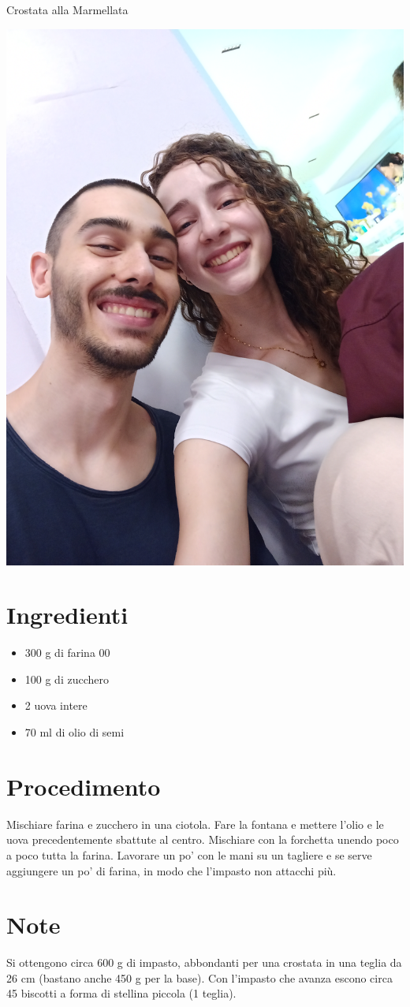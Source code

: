 \documentclass[../../main.tex]{subfiles}
\begin{document}
Crostata alla Marmellata

\noindent
\begin{minipage}[t]{0.3\textwidth}
    \includegraphics[valign=T, width=1\linewidth]{images/test.jpg}  %
    \section*{Ingredienti}
    \begin{itemize}
        \item 300 g di farina 00
        \item 100 g di zucchero
        \item 2 uova intere
        \item 70 ml di olio di semi
    \end{itemize}
\end{minipage}%
\hfill
\begin{minipage}[t]{0.65\textwidth}
\section*{Procedimento}
Mischiare farina e zucchero in una ciotola. Fare la fontana e mettere l'olio e le uova precedentemente sbattute al centro. Mischiare con la forchetta unendo poco a poco tutta la farina. Lavorare un po' con le mani su un tagliere e se serve aggiungere un po' di farina, in modo che l'impasto non attacchi più.
\end{minipage}
\vspace*{\fill}
\section*{Note}	%
Si ottengono circa 600 g di impasto, abbondanti per una crostata in una teglia da 26  cm (bastano anche 450 g per la base). Con l'impasto che avanza escono circa 45 biscotti a forma di stellina piccola (1 teglia).
\vspace*{\fill}
\end{document}
